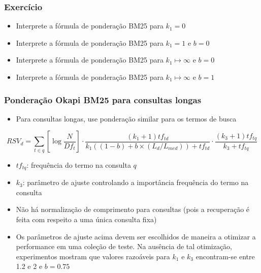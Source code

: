 \documentclass[compress]{beamer}
\def\myblue#1{\textcolor{texblue}{#1}}
\begin{document}
\begin{frame}
\frametitle{Exercício}
\pause[2]

\begin{itemize}
\item Interprete a fórmula de ponderação BM25 para $k_1 =0$ 
\item Interprete a fórmula de ponderação BM25 para $k_1 =1$ e $b=0$
\item Interprete a fórmula de ponderação BM25 para $k_1 \mapsto \infty$ e $b=0$
\item Interprete a fórmula de ponderação BM25 para $k_1 \mapsto \infty$ e $b=1$
\end{itemize}

\end{frame}




\begin{frame}[<+->]
\frametitle{Ponderação Okapi BM25 para consultas longas}
\pause[2]

\begin{itemize}
\item Para consultas longas, use ponderação similar para os termos de busca
\end{itemize}

\begin{equation}
\nonumber
RSV_d = \sum_{t\in q} \left[\log\frac{N}{Df_t}\right]
\cdot
\frac{(k_1+1)tf_{td}}{k_1((1-b) + b \times (L_d/L_{med}))+tf_{td}}
\cdot
\frac{(k_3 + 1)tf_{tq}}{k_3 + tf_{tq}} \label{bm25-3}
\end{equation}
\begin{itemize}
\item $tf_{tq}$: frequência do termo na consulta $q$
\item $k_3$: parâmetro de ajuste controlando a importância frequência do termo na consulta

\item Não há normalização de comprimento para consultas (pois a recuperação é feita com respeito a uma única consulta fixa)

\item Os parâmetros de ajuste acima devem ser escolhidos de maneira a otimizar a performance  em uma coleção de teste. Na ausência de tal otimização, experimentos mostram que valores  razoáveis para $k_1$ e $k_3$ encontram-se entre  1.2 e 2 e $b = 0.75$
\end{itemize}

\end{frame}
\end{document}
